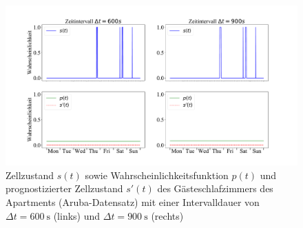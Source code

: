 \begin{figure}[!h]
	\begin{center}
		\includegraphics[width=\linewidth]{Abbildungen/evaluation/bin_size_influence_second_bedroom_binary.pdf}
		\caption[Zellzustand $s(t)$ sowie Wahrscheinlichkeitsfunktion $p(t)$ und prognostizierter Zellzustand $s'(t)$ des Gästeschlafzimmers des Apartments mit einer Intervalldauer von $\Delta t = \SI{600}{\second}$ und $\Delta t = \SI{900}{\second}$]{Zellzustand $s(t)$ sowie Wahrscheinlichkeitsfunktion $p(t)$ und prognostizierter Zellzustand $s'(t)$ des Gästeschlafzimmers des Apartments (Aruba-Datensatz) mit einer Intervalldauer von $\Delta t = \SI{600}{\second}$ (links) und $\Delta t = \SI{900}{\second}$ (rechts)}
		\label{fig.bin_size_influence_second_bedroom_binary}
	\end{center}
\end{figure}

